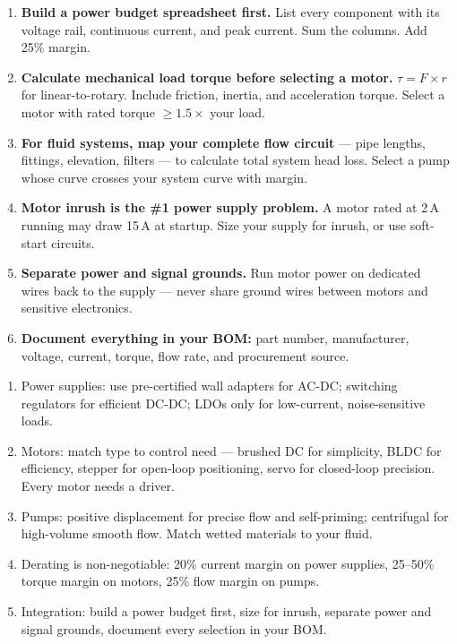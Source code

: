 \documentclass[11pt,letterpaper,twoside,openany]{book}
\begin{document}
\begin{enumerate}[leftmargin=1.5em]
  \item \textbf{Build a power budget spreadsheet first.} List every component with its voltage rail, continuous current, and peak current. Sum the columns. Add 25\% margin.
  \item \textbf{Calculate mechanical load torque before selecting a motor.} $\tau = F \times r$ for linear-to-rotary. Include friction, inertia, and acceleration torque. Select a motor with rated torque $\geq 1.5\times$ your load.
  \item \textbf{For fluid systems, map your complete flow circuit} --- pipe lengths, fittings, elevation, filters --- to calculate total system head loss. Select a pump whose curve crosses your system curve with margin.
  \item \textbf{Motor inrush is the \#1 power supply problem.} A motor rated at 2\,A running may draw 15\,A at startup. Size your supply for inrush, or use soft-start circuits.
  \item \textbf{Separate power and signal grounds.} Run motor power on dedicated wires back to the supply --- never share ground wires between motors and sensitive electronics.
  \item \textbf{Document everything in your BOM:} part number, manufacturer, voltage, current, torque, flow rate, and procurement source.
\end{enumerate}

\begin{keyconceptbox}
\begin{enumerate}[nosep,leftmargin=1.5em]
  \item Power supplies: use pre-certified wall adapters for AC-DC; switching regulators for efficient DC-DC; LDOs only for low-current, noise-sensitive loads.
  \item Motors: match type to control need --- brushed DC for simplicity, BLDC for efficiency, stepper for open-loop positioning, servo for closed-loop precision. Every motor needs a driver.
  \item Pumps: positive displacement for precise flow and self-priming; centrifugal for high-volume smooth flow. Match wetted materials to your fluid.
  \item Derating is non-negotiable: 20\% current margin on power supplies, 25--50\% torque margin on motors, 25\% flow margin on pumps.
  \item Integration: build a power budget first, size for inrush, separate power and signal grounds, document every selection in your BOM.
\end{enumerate}
\end{keyconceptbox}
\end{document}
